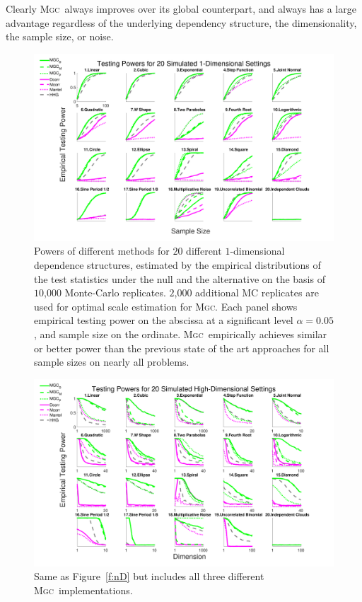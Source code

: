 \documentclass[11pt]{article}
\providecommand{\sct}[1]{{\normalfont\textsc{#1}}}
\newcommand{\Mgc}{\sct{Mgc}}
\begin{document}
Clearly \Mgc~always improves over its global counterpart, and always has a large advantage regardless of the underlying dependency structure, the dimensionality, the sample size, or noise.

\begin{figure}[htbp]
\includegraphics[width=1.0\textwidth]{../Figures/Fig1DPowerAll}
\caption{
Powers of different methods for $20$ different $1$-dimensional dependence structures, estimated by the empirical distributions of the test statistics under the null and the alternative on the basis of $10$,$000$ Monte-Carlo replicates. $2$,$000$ additional MC replicates are used for optimal scale estimation for \Mgc.
Each panel shows empirical testing power on the abscissa at a significant level $\alpha=0.05$, and sample size on the ordinate.
\Mgc~empirically achieves similar or better power than the previous state of the art approaches for all sample sizes on nearly all problems.}
\label{f:1DAll}
\end{figure}

\begin{figure}[htbp]
\includegraphics[width=1.0\textwidth]{../Figures/FigHDPowerAll}
\caption{
Same as Figure~\ref{f:nD} but includes all three different \Mgc~implementations.}
\label{f:nDAll}
\end{figure}
\end{document}
